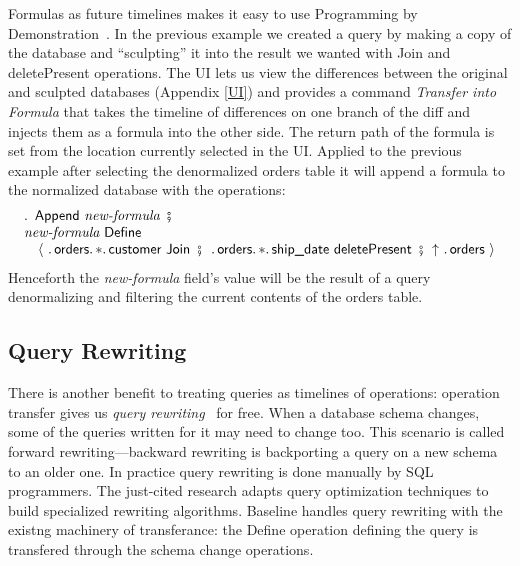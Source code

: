 \documentclass[english,submission]{programming}
\theoremstyle{definition}
\DeclareMathOperator{\exec}{\ \fatsemi\ \ }
\begin{document}
Formulas as future timelines makes it easy to use Programming by Demonstration~\cite{cypher93-pbd}. In the previous example we created a query by making a copy of the database and ``sculpting'' it into the result we wanted with \textsf{Join} and \textsf{deletePresent} operations. The UI lets us view the differences between the original and sculpted databases (Appendix \ref{UI}) and provides a command \textit{Transfer into Formula} that takes the timeline of differences on one branch of the diff and injects them as a formula into the other side. The return path of the formula is set from the location currently selected in the UI. Applied to the previous example after selecting the denormalized \textsf{orders} table it will append a formula to the normalized database with the operations:
\[
\begin{array}{l}
  \ldotp \textsf{ Append } \textit{new-formula} \exec\\
  \textit{new-formula} \textsf{ Define } \\
  \quad \langle
\ \ldotp \textsf{orders}\ldotp * \ldotp \textsf{customer Join} \exec
\ldotp \textsf{orders}\ldotp * \ldotp \textsf{ship\_date deletePresent} \exec
\!\!\uparrow \ \ldotp \textsf{orders}\
  \rangle\\
\end{array}
\]
Henceforth the \textit{new-formula} field's value will be the result of a query  denormalizing and filtering the current contents of the orders table.






\subsection{Query Rewriting}\label{query-rewriting}

There is another benefit to treating queries as timelines of operations: operation transfer gives us \textit{query rewriting}~\cite{curino08, herrmann17} for free. When a database schema changes, some of the queries written for it may need to change too. This scenario is called forward rewriting---backward rewriting is backporting a query on a new schema to an older one.
In practice query rewriting is done manually by SQL programmers. The just-cited research adapts query optimization techniques to build specialized rewriting algorithms.
Baseline handles query rewriting with the existng machinery of transferance: the \textsf{Define} operation defining the query is transfered through the schema change operations.
\end{document}
